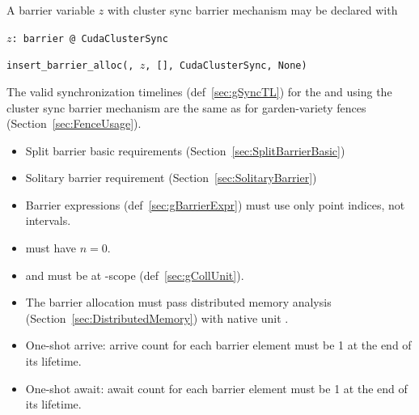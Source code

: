
A barrier variable $z$ with cluster sync barrier mechanism may be declared with

\texttt{$z$: barrier @ CudaClusterSync}

\texttt{insert\_barrier\_alloc(, $z$, [], CudaClusterSync, None)}

The valid synchronization timelines (def~\ref{sec:gSyncTL}) for the  and  using the cluster sync barrier mechanism are the same as for garden-variety fences (Section~\ref{sec:FenceUsage}).

\begin{itemize}
  \item Split barrier basic requirements (Section~\ref{sec:SplitBarrierBasic})
  \item Solitary barrier requirement (Section~\ref{sec:SolitaryBarrier})
  \item Barrier expressions (def~\ref{sec:gBarrierExpr}) must use only point indices, not intervals.
  \item {} must have $n=0$.
  \item {} and  must be at -scope (def~\ref{sec:gCollUnit}).
  \item The barrier allocation must pass distributed memory analysis (Section~\ref{sec:DistributedMemory}) with native unit .
\end{itemize}

\begin{itemize}
  \item One-shot arrive: arrive count for each barrier element must be 1 at the end of its lifetime.
  \item One-shot await: await count for each barrier element must be 1 at the end of its lifetime.
\end{itemize}


